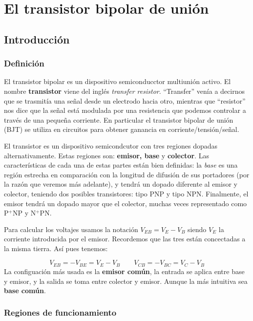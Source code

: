 
\chapter{El transistor bipolar de unión}

\section{Introducción}

\subsection{Definición}

El transistor bipolar es un dispositivo semiconducctor multiunión activo. El nombre \textbf{transistor} viene del inglés \textit{transfer resistor}. ``Transfer'' venía a decirnos que se trasmitía una señal desde un electrodo hacia otro, mientras que ``resistor'' nos dice que la señal está modulada por una resistencia que podemos controlar a través de una pequeña corriente. En particular el transistor bipolar de unión (BJT) se utiliza en circuitos para obtener ganancia en corriente/tensión/señal. 

El transistor es un dispositivo semicondcutor con tres regiones dopadas alternativamente. Estas regiones son: \textbf{emisor, base} y \textbf{colector}. Las características de cada una de estas partes están bien definidas: la \textit{base} es una región estrecha en comparación con la longitud de difusión de sus portadores (por la razón que veremos más adelante), y tendrá un dopado diferente al emisor y colector, teniendo dos posibles transistores: tipo PNP y tipo NPN. Finalmente, el emisor tendrá un dopado mayor que el colector, muchas veces representado como P$^+$NP y N$^+$PN. 

Para calcular los voltajes usamos la notación $V_{EB} = V_E - V_B$ siendo $V_E$ la corriente introducida por el emisor. Recordemos que las tres están concectadas a la misma tierra. Así pues tenemos:

\begin{equation*}
    V_{EB} = - V_{BE} = V_E - V_B \qquad 
    V_{CB} = - V_{BC} = V_C - V_B 
\end{equation*}
La configuación más usada es la \textbf{emisor común}, la entrada se aplica entre base y emisor, y la salida se toma entre colector y emisor. Aunque la más intuitiva sea \textbf{base común}. 

\subsection{Regiones de funcionamiento}

